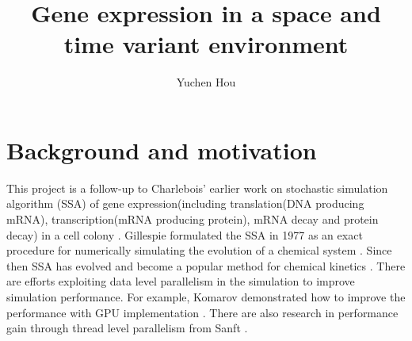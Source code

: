 \documentclass[12pt]{article}
\begin{document}
\title{Gene expression in a space and time variant environment}
\author{Yuchen Hou}
\maketitle

\section{Background and motivation}
This project is a follow-up to Charlebois' earlier work on stochastic simulation algorithm (SSA) of gene expression(including translation(DNA producing mRNA), transcription(mRNA producing protein), mRNA decay and protein decay) in a cell colony \cite{charlebois2011algorithm}. Gillespie formulated the SSA in 1977 as an exact procedure for numerically simulating the evolution of a chemical system \cite{gillespie1977exact}. Since then SSA has evolved and become a popular method for chemical kinetics \cite{gillespie2007stochastic, gillespie2001approximate}. There are efforts exploiting data level parallelism in the simulation to improve simulation performance. For example, Komarov demonstrated how to improve the performance with GPU implementation \cite {komarov2012accelerating}. There are also research in performance gain through thread level parallelism from Sanft \cite{sanft2011stochkit2}.
\end{document}

